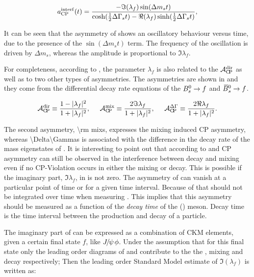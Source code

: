 \newcommand{\half}{\frac{1}{2}}
\begin{equation}
  \centering
  a_{\rm CP}^{\rm interf}(t) = \frac{ - \Im(\lambda_f) \sin(\Delta m_s t)} {\cosh(\half \Delta\Gamma_s t) - \Re(\lambda_f)\sinh(\half\Delta\Gamma_s t)},
\label{cpv_interf}
\end{equation}

\noindent It can be seen that the asymmetry of  shows an oscillatory behaviour versus time, due
to the presence of the $\sin(\Delta m_s t)$ term. The frequency of the oscillation is driven by $\Delta m_s$, whereas
the amplitude is proportional to $\Im\lambda_f$.

For completeness, according to \cite{DeBruyn-thesis,jeroenThesis}, the parameter $\lambda_f$ is also related to the $\mathcal{A}_{\rm C\!P}^{\rm dir}$ as well as to two
other types of asymmetries. The asymmetries are shown in  and they come from the differential decay rate equations of the $B^0_s\rightarrow f$
 and $\kern 0.18em\overline{\kern -0.18em B}{}^0_s\rightarrow f$.

\begin{equation}
  \centering
  \Acp{\rm dir}      \equiv \frac{ 1-|\lambda_f|^2} {1 + |\lambda_f|^2},\;\;\;\;\;
  \Acp{\rm mix}      \equiv \frac{ 2 \Im\lambda_f} {1 + |\lambda_f|^2},\;\;\;\;\;
  \Acp{\Delta\Gamma} \equiv \frac{ 2 \Re\lambda_f} {1 + |\lambda_f|^2}.
\label{cp_asym_lambda}
\end{equation}

The second asymmetry, \Acp{\rm mix}, expresses the mixing induced CP asymmetry, whereas \Acp{\Delta\Gamma} is associated with the
difference in the decay rate of the mass eigenstates of . It is interesting to point out that according
to  and  CP asymmetry can still be observed in the interference between decay and
mixing even if no CP-Violation occurs in either the mixing or decay. This is possible if the imaginary part, $\Im\lambda_f$, in  is not zero.
The asymmetry of  can vanish at a particular point of time or for a given time interval. Because of that  should not
be integrated over time when measuring \phis. This implies that this asymmetry should be measured as a function of the
{\it decay time} of the \Bs (\Bsb) meson. Decay time is the time interval between the production and decay of a particle.

The imaginary part of  can be expressed as a combination of CKM elements, given a certain final state $f$, like ${J\mskip -3mu/\mskip -2mu\psi\mskip 2mu}\phi$.
Under the assumption that for this final state only the leading order diagrams of  and  contribute to the
the \Bs, \Bsb mixing and decay respectively; Then the leading order Standard Model estimate of $\Im(\lambda_f)$ is written as:

